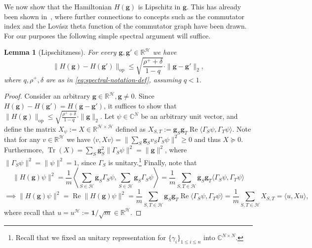 \documentclass
[11pt,letterpaper]
{article}
\newtheorem{lemma}[theorem]{Lemma}
\theoremstyle{definition}
\newcommand{\Tr}{\operatorname{Tr}}
\newcommand{\R}{{\mathbb R}}
\newcommand{\1}{\mathbf{1}}
\newcommand{\C}{\mathbb C}
\newcommand{\cH}{\mathcal H}
\renewcommand{\geq}{\geqslant}
\renewcommand{\leq}{\leqslant}
\renewcommand{\succeq}{\succcurlyeq}
\newcommand{\Ree}{\operatorname{Re}}
\begin{document}
We now show that the Hamiltonian $H(\bm g)$ is Lipschitz in $\bm g$. This has already been shown in~\cite{anschuetzStronglyInteractingFermions2025, feng2020spectrum}, where further connections to concepts such as the commutator index and the Lov\'asz theta function of the commutator graph have been drawn. For our purposes the following simple spectral argument will suffice.
\begin{lemma}[Lipschitzness]\label{lem:lipschitz-operator}
    For every $\bm g, \bm g'\in\R^\cH$ we have 
    \[\|H(\bm g) - H(\bm g')\|_{\operatorname{op}}\leq\sqrt{\frac{\rho^+ + \delta}{1 - q}}\cdot\|\bm g - \bm g'\|_2,\]
    where $q, \rho^+, \delta$ are as in \cref{eq:spectral-notation-def}, assuming $q < 1$.
\end{lemma}
\begin{proof}
    Consider an arbitrary $\bm g\in\R^\cH, \bm g\neq 0$. Since $H(\bm g) - H(\bm g') = H(\bm g - \bm g')$, it suffices to show that $\|H(\bm g)\|_{\operatorname{op}}\leq\sqrt{\frac{\rho^+ + \delta}{1 - q}}\cdot\|\bm g\|_2$. Let $\psi\in\C^{N}$ be an arbitrary unit vector, and define the matrix $X_\psi:= X\in\R^{\cH\times\cH}$ defined as $X_{S, T}:= \bm g_S\bm g_T\Ree\langle\Gamma_S\psi, \Gamma_T\psi\rangle$. Note that for any $v\in\R^\cH$ we have $\langle v, Xv\rangle = \|\sum_S\bm g_Sv_S\Gamma_S\psi\|^2\geq 0$ and thus $X\succeq 0$. Furthermore, $\Tr(X) = \sum_S\bm g_S^2\|\Gamma_S\psi\|^2 = \|\bm g\|^2$, where $\|\Gamma_S\psi\|^2 = \|\psi\|^2 = 1$, since $\Gamma_S$ is unitary.\footnote{Recall that we fixed an unitary representation for $\{\gamma_i\}_{1\leq i\leq n}$ into $\C^{N\times N}$.} Finally, note that 
    \[\|H(\bm g)\psi\|^2 = \frac{1}{m}\left\langle\sum_{S\in\cH}\bm g_S\Gamma_S\psi, \sum_{S\in\cH}\bm g_S\Gamma_S\psi\right\rangle = \frac{1}{m}\sum_{S, T\in\cH}\bm g_S\bm g_T\langle\Gamma_S\psi, \Gamma_T\psi\rangle\] 
    \[\implies\|H(\bm g)\psi\|^2 = \Ree\|H(\bm g)\psi\|^2 = \frac{1}{m}\sum_{S, T\in\cH}\bm g_S\bm g_T\Ree\langle\Gamma_S\psi, \Gamma_T\psi\rangle = \frac{1}{m}\sum_{S, T\in\cH}X_{S, T} = \langle u, Xu\rangle,\]
    where recall that $u = u^\cH:= \1/\sqrt{m}\in\R^\cH$. 


\end{proof}
\end{document}
